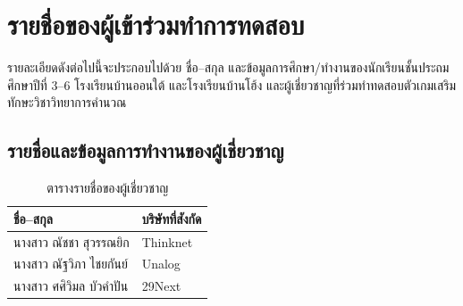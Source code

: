 \chapter{รายชื่อของผู้เข้าร่วมทำการทดสอบ}
รายละเอียดดังต่อไปนี้จะประกอบไปด้วย ชื่อ--สกุล และข้อมูลการศึกษา/ทำงานของนักเรียนชั้นประถมศึกษาปีที่ 3--6 โรงเรียนบ้านออนใต้ และโรงเรียนบ้านโฮ้ง และผู้เชี่ยวชาญที่ร่วมทำทดสอบตัวเกมเสริมทักษะวิชาวิทยาการคำนวณ
\section{รายชื่อและข้อมูลการทำงานของผู้เชี่ยวชาญ}
\begin{table}[h]
    \begin{center}
        \begin{tabular}{ |p{5cm}|p{5cm}| }
            \hline
            ชื่อ--สกุล & บริษัทที่สังกัด\\
            \hline\hline
            นางสาว ณัชชา สุวรรณยิก & Thinknet\\
            \hline
            นางสาว ณัฐวิภา ไชยกันย์ & Unalog\\
            \hline
            นางสาว ศศิวิมล บัวคำปัน & 29Next\\
            \hline
        \end{tabular}
    \end{center}
    \caption[ตารางรายชื่อของผู้เชี่ยวชาญ]{ตารางรายชื่อของผู้เชี่ยวชาญ}
    \label{expertstable}
\end{table}

